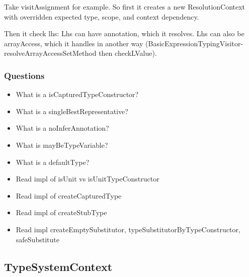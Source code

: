 \documentclass{article}
\begin{document}
Take visitAssignment for example. So first it creates a new ResolutionContext with overridden expected type, scope, and context dependency.

Then it check lhs: Lhs can have annotation, which it resolves. Lhs can also be arrayAccess, which it handles in another way (BasicExpressionTypingVisitor-resolveArrayAccessSetMethod then checkLValue).


\subsubsection{Questions}
\begin{itemize}
    \item What is a isCapturedTypeConstructor?
    \item What is a singleBestRepresentative?
    \item What is a noInferAnnotation?
    \item What is mayBeTypeVariable?
    \item What is a defaultType?
    \item Read impl of isUnit vs isUnitTypeConstructor
    \item Read impl of createCapturedType
    \item Read impl of createStubType
    \item Read impl createEmptySubstitutor, typeSubstitutorByTypeConstructor, safeSubstitute
\end{itemize}

\subsection{TypeSystemContext}
\end{document}
